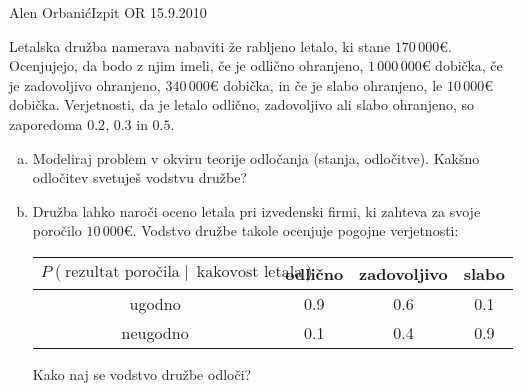 \begin{naloga}{Alen Orbanić}{Izpit OR 15.9.2010}
\begin{vprasanje}
Letalska družba namerava nabaviti že rabljeno letalo, ki stane $170\,000 €$.
Ocenjujejo, da bodo z njim imeli,
če je odlično ohranjeno, $1\,000\,000 €$ dobička,
če je zadovoljivo ohranjeno, $340\,000 €$ dobička,
in če je slabo ohranjeno, le $10\,000 €$ dobička.
Verjetnosti, da je letalo odlično, zadovoljivo ali slabo ohranjeno,
so zaporedoma $0.2$, $0.3$ in $0.5$.
\begin{enumerate}[(a)]
\item Modeliraj problem v okviru teorije odločanja (stanja, odločitve).
Kakšno odločitev svetuješ vodstvu družbe?

\item Družba lahko naroči oceno letala pri izvedenski firmi,
ki zahteva za svoje poročilo $10\,000 €$.
Vodstvo družbe takole ocenjuje pogojne verjetnosti:
\begin{center}
\begin{tabular}{c|ccc}
$P(\text{rezultat poročila} \;|\;\ \text{kakovost letala})$
& odlično & zadovoljivo & slabo \\ \hline
ugodno & 0.9 & 0.6 & 0.1 \\
neugodno & 0.1 & 0.4 & 0.9
\end{tabular}
\end{center}
Kako naj se vodstvo družbe odloči?
\end{enumerate}

\end{vprasanje}
\begin{odgovor}
\end{odgovor}
\end{naloga}

